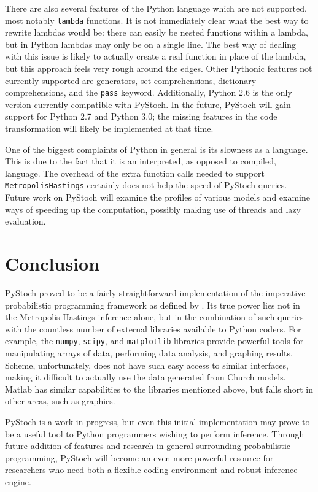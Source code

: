 \documentclass[12pt,letterpaper]{article}
\begin{document}
There are also several features of the Python language which are not
supported, most notably \texttt{lambda} functions.  It is not
immediately clear what the best way to rewrite lambdas would be: there
can easily be nested functions within a lambda, but in Python lambdas
may only be on a single line.  The best way of dealing with this issue
is likely to actually create a real function in place of the lambda,
but this approach feels very rough around the edges.  Other Pythonic
features not currently supported are generators, set comprehensions,
dictionary comprehensions, and the \texttt{pass} keyword.
Additionally, Python 2.6 is the only version currently compatible with
PyStoch.  In the future, PyStoch will gain support for Python 2.7 and
Python 3.0; the missing features in the code transformation will
likely be implemented at that time.

One of the biggest complaints of Python in general is its slowness as
a language.  This is due to the fact that it is an interpreted, as
opposed to compiled, language.  The overhead of the extra function
calls needed to support \texttt{MetropolisHastings} certainly does not
help the speed of PyStoch queries.  Future work on PyStoch will
examine the profiles of various models and examine ways of speeding up
the computation, possibly making use of threads and lazy evaluation.

\section{Conclusion}

PyStoch proved to be a fairly straightforward implementation of the
imperative probabilistic programming framework as defined by
.  Its true power lies not in the
Metropolis-Hastings inference alone, but in the combination of such
queries with the countless number of external libraries available to
Python coders.  For example, the \texttt{numpy}, \texttt{scipy}, and
\texttt{matplotlib} libraries provide powerful tools for manipulating
arrays of data, performing data analysis, and graphing results.
Scheme, unfortunately, does not have such easy access to similar
interfaces, making it difficult to actually use the data generated
from Church models.  Matlab has similar capabilities to the libraries
mentioned above, but falls short in other areas, such as graphics.

PyStoch is a work in progress, but even this initial implementation
may prove to be a useful tool to Python programmers wishing to perform
inference.  Through future addition of features and research in
general surrounding probabilistic programming, PyStoch will become an
even more powerful resource for researchers who need both a flexible
coding environment and robust inference engine.
\end{document}
